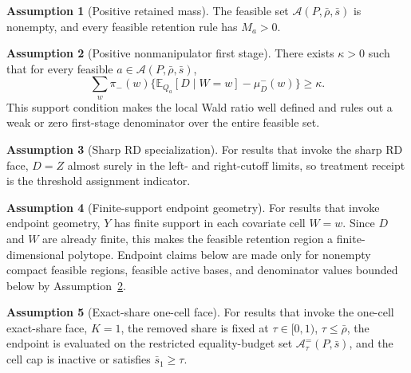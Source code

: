 \documentclass[11pt]{article}
\newcommand{\E}{\mathbb{E}}
\theoremstyle{definition}
\newtheorem{assumption}{Assumption}
\theoremstyle{plain}
\theoremstyle{remark}
\begin{document}
\begin{assumption}[Positive retained mass]\label{ass:positive-retained}
The feasible set \(\mathcal A(P,\bar\rho,\bar s)\) is nonempty, and every feasible
retention rule has \(M_a>0\).
\end{assumption}

\begin{assumption}[Positive nonmanipulator first stage]\label{ass:positive-first-stage}
There exists \(\kappa>0\) such that for every feasible
\(a\in\mathcal A(P,\bar\rho,\bar s)\),
\[
  \sum_w \pi_-(w)\{\E_{Q_a}[D\mid W=w]-\mu^-_D(w)\}\ge \kappa .
\]
This support condition makes the local Wald ratio well defined and rules out a weak or
zero first-stage denominator over the entire feasible set.
\end{assumption}

\begin{assumption}[Sharp RD specialization]\label{ass:sharp-rd-specialization}
For results that invoke the sharp RD face, \(D=Z\) almost surely in the left- and
right-cutoff limits, so treatment receipt is the threshold assignment indicator.
\end{assumption}

\begin{assumption}[Finite-support endpoint geometry]\label{ass:finite-support-geometry}
For results that invoke endpoint geometry, \(Y\) has finite support in each covariate cell
\(W=w\).  Since \(D\) and \(W\) are already finite, this makes the feasible retention
region a finite-dimensional polytope.  Endpoint claims below are made only for nonempty
compact feasible regions, feasible active bases, and denominator values bounded below by
Assumption~\ref{ass:positive-first-stage}.
\end{assumption}

\begin{assumption}[Exact-share one-cell face]\label{ass:exact-share-one-cell}
For results that invoke the one-cell exact-share face, \(K=1\), the removed share is fixed
at \(\tau\in[0,1)\), \(\tau\le\bar\rho\), the endpoint is evaluated on the restricted
equality-budget set \(\mathcal A^{=}_\tau(P,\bar s)\), and the cell cap is inactive or
satisfies \(\bar s_1\ge\tau\).
\end{assumption}
\end{document}

